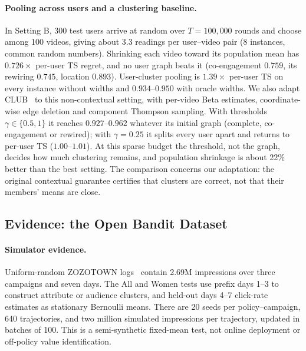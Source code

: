 \documentclass[sigconf,review,anonymous]{acmart}
\begin{document}
\paragraph{Pooling across users and a clustering baseline.} In Setting B, 300 test users arrive at random over $T=100{,}000$ rounds and choose among 100 videos, giving about 3.3 readings per user--video pair (8 instances, common random numbers). Shrinking each video toward its population mean has $0.726\times$ per-user TS regret, and no user graph beats it (co-engagement $0.759$, its rewiring $0.745$, location $0.893$). User-cluster pooling is $1.39\times$ per-user TS on every instance without widths and $0.934$--$0.950$ with oracle widths. We also adapt CLUB~\cite{gentile2014clustering} to this non-contextual setting, with per-video Beta estimates, coordinate-wise edge deletion and component Thompson sampling. With thresholds $\gamma\in\{0.5,1\}$ it reaches $0.927$--$0.962$ whatever its initial graph (complete, co-engagement or rewired); with $\gamma=0.25$ it splits every user apart and returns to per-user TS ($1.00$--$1.01$). At this sparse budget the threshold, not the graph, decides how much clustering remains, and population shrinkage is about 22\% better than the best setting. The comparison concerns our adaptation: the original contextual guarantee certifies that clusters are correct, not that their members' means are close.

\subsection{Evidence: the Open Bandit Dataset}

\paragraph{Simulator evidence.} Uniform-random ZOZOTOWN logs~\cite{saito2021obd} contain 2.69M impressions over three campaigns and seven days. The All and Women tests use prefix days 1--3 to construct attribute or audience clusters, and held-out days 4--7 click-rate estimates as stationary Bernoulli means. There are 20 seeds per policy--campaign, 640 trajectories, and two million simulated impressions per trajectory, updated in batches of 100. This is a semi-synthetic fixed-mean test, not online deployment or off-policy value identification.
\end{document}
